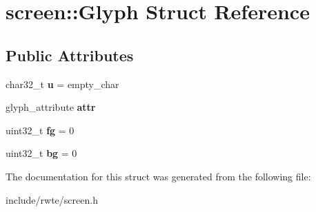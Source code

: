 \hypertarget{structscreen_1_1Glyph}{}\section{screen\+::Glyph Struct Reference}
\label{structscreen_1_1Glyph}
\subsection*{Public Attributes}
\begin{DoxyCompactItemize}
\item 
\mbox{\label{structscreen_1_1Glyph_a5a17478b69b0b8d57890354cd3e7c937}} 
char32\+\_\+t {\bfseries u} = empty\+\_\+char
\item 
\mbox{\label{structscreen_1_1Glyph_a1c6a33da594d18266d61cbaa5fdfba86}} 
glyph\+\_\+attribute {\bfseries attr}
\item 
\mbox{\label{structscreen_1_1Glyph_a7711af935f88ac5e155a99f81286a705}} 
uint32\+\_\+t {\bfseries fg} = 0
\item 
\mbox{\label{structscreen_1_1Glyph_a5769880556413d6bac9c9c15d203b1e5}} 
uint32\+\_\+t {\bfseries bg} = 0
\end{DoxyCompactItemize}


The documentation for this struct was generated from the following file\+:\begin{DoxyCompactItemize}
\item 
include/rwte/screen.\+h\end{DoxyCompactItemize}
